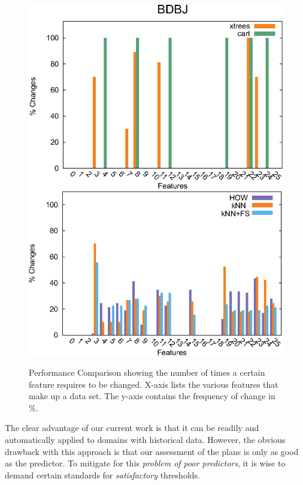 \documentclass{sig-alternate}
\begin{document}
\begin{figure}[t]
\begin{minipage}{0.5\textwidth}
\end{minipage}
\begin{minipage}{0.5\textwidth}
\includegraphics[width=0.9\linewidth]{Deltas-BDBJ.eps}
\label{fig:delta_apache}
\end{minipage}
\caption{Performance Comparison showing the number of times a certain feature requires to be changed. X-axis lists the various features that make up a data set. The y-axis contains the frequency of change in \%.}

\end{figure}

The clear advantage of our current work is that it can be readily and automatically applied to domains with historical data. However, the obvious drawback with this approach is that our assessment of the plans is only as good as the predictor. To mitigate for this {\em problem of poor predictors}, it is wise to demand certain standards for {\em satisfactory} thresholds. 
\end{document}

